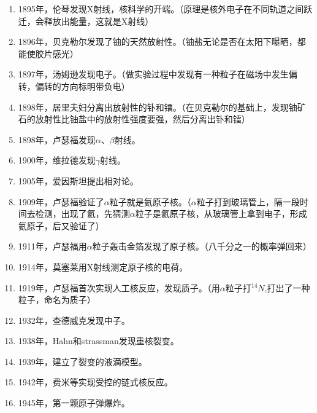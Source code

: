 \begin{enumerate}
    \item 1895年，伦琴发现X射线，核科学的开端。（原理是核外电子在不同轨道之间跃迁，会释放出能量，这就是X射线）
    \item 1896年，贝克勒尔发现了铀的天然放射性。（铀盐无论是否在太阳下曝晒，都能使胶片感光）
    \item 1897年，汤姆逊发现电子。（做实验过程中发现有一种粒子在磁场中发生偏转，偏转的方向标明带负电）
    \item 1898年，居里夫妇分离出放射性的钋和镭。（在贝克勒尔的基础上，发现铀矿石的放射性比铀盐中的放射性强度要强，然后分离出钋和镭）
    \item 1898年，卢瑟福发现$\alpha$、$\beta$射线。
    \item 1900年，维拉德发现$\gamma$射线。
    \item 1905年，爱因斯坦提出相对论。
    \item 1909年，卢瑟福验证了$\alpha$粒子就是氦原子核。（$\alpha$粒子打到玻璃管上，隔一段时间去检测，出现了氦，先猜测$\alpha$粒子是氦原子核，从玻璃管上拿到电子，形成氦原子，后又验证了）
    \item 1911年，卢瑟福用$\alpha$粒子轰击金箔发现了原子核。（八千分之一的概率弹回来）
    \item 1914年，莫塞莱用X射线测定原子核的电荷。
    \item 1919年，卢瑟福首次实现人工核反应，发现质子。（用$\alpha$粒子打$^{14}N$,打出了一种粒子，命名为质子）
    \item 1932年，查德威克发现中子。
    \item 1938年，Hahn和strassman发现重核裂变。
    \item 1939年，建立了裂变的液滴模型。
    \item 1942年，费米等实现受控的链式核反应。
    \item 1945年，第一颗原子弹爆炸。
\end{enumerate}

\clearpage